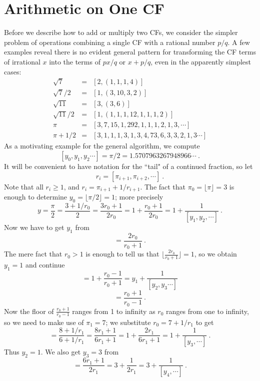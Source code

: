 \documentclass[11pt, oneside]{amsart}   	%
\begin{document}
\section{Arithmetic on One CF}
Before we describe how to add or multiply two CFs, we consider the simpler problem of operations combining a single CF with a rational number $p/q$. A few examples reveal there is no evident general pattern for transforming the CF terms of irrational $x$ into the terms of $px/q$ or $x + p/q$, even in the apparently simplest cases:
\begin{eqnarray*}
\sqrt{7} & = & [2, (1, 1, 1, 4)] \\
\sqrt{7}/2 & = & [1, (3, 10, 3, 2)] \\
\sqrt{11} & = & [3, (3, 6)] \\
\sqrt{11}/2 & = & [1, (1, 1, 1, 12, 1, 1, 1, 2)] \\
\pi & = & [3,7,15,1,292,1,1,1, 2, 1, 3,\cdots]\\
\pi + 1/2 & = & [3, 1, 1, 1, 3, 1, 3, 4, 73, 6, 3, 3, 2, 1, 3\cdots]
\end{eqnarray*}
As a motivating example for the general algorithm, we compute
\[[y_0,y_1,y_2 \cdots] = \pi/2 = 1.5707963267948966\cdots\ .
\]
It will be convenient to have notation for the ``tail" of a continued fraction, so let
\[
r_i = [\pi_{i+1}, \pi_{i+2},\cdots]\ .
\]
Note that all $r_i \geq 1$, and $r_i = \pi_{i+1} + 1/r_{i+1}$. The fact that $\pi_0 = \lfloor \pi \rfloor= 3$ is enough to determine $y_0=\lfloor \pi/2 \rfloor=1$; more precisely
\begin{equation}
y = \frac{\pi}{2} = \frac{3 + 1/r_0}{2} = \frac{3r_0+1}{2r_0} = 1 + \frac{r_0+1}{2r_0}= 1 + \frac{1}{[y_1,y_2,\cdots]}\ .
\end{equation}
Now we have to get $y_1$ from 
\begin{equation}
[y_1,y_2,\cdots] = \frac{2r_0}{r_0+1}\ .
\end{equation}
The mere fact that $r_0>1$ is enough to tell us that $\lfloor \frac{2r_0}{r_0+1} \rfloor = 1$, so we obtain $y_1=1$ and continue
\begin{equation}
[y_1,y_2,\cdots] = 1 + \frac{r_0-1}{r_0+1} = y_1 + \frac{1}{[y_2,y_3\cdots]}
\end{equation}
\begin{equation}
[y_2,\cdots] = \frac{r_0+1}{r_0-1} \ .
\end{equation}
Now the floor of $\frac{r_0+1}{r_0-1}$ ranges from 1 to infinity as $r_0$ ranges from one to infinity, so we need to make use of $\pi_1 = 7$; we substitute $r_0 = 7+1/r_1$ to get
\begin{equation}
[y_2,\cdots] = \frac{8 + 1/r_1}{6 + 1/r_1} = \frac{8r_1 + 1}{6r_1 + 1} = 1 + \frac{2r_1}{6r_1 + 1}= 1 + \frac{1}{[y_3,\cdots]}\ .
\end{equation}
Thus $y_2=1$.  We also get $y_3 = 3$ from
\begin{equation}
[y_3,\cdots] =  \frac{6r_1 + 1}{2r_1} = 3 + \frac{1}{2r_1} = 3 + \frac{1}{[y_4,\cdots]}\ .
\end{equation}
\end{document}
